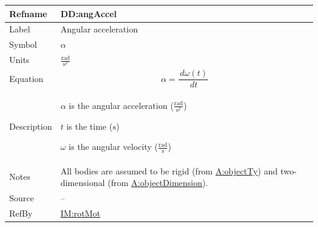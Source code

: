 \documentclass[12pt]{article}
\begin{document}
\vspace{\baselineskip}
\noindent
\begin{minipage}{\textwidth}
\begin{tabular}{>{\raggedright}p{}>{\raggedright\arraybackslash}p{}}
\toprule \textbf{Refname} & \textbf{DD:angAccel}
\label{DD:angAccel}
\\ \midrule
Label & Angular acceleration
        
\\ \midrule
Symbol & $α$
         
\\ \midrule
Units & $\frac{\text{rad}}{\text{s}^{2}}$
        
\\ \midrule
Equation & \begin{displaymath}
           α=\frac{\,dω\left(t\right)}{\,dt}
           \end{displaymath}
\\ \midrule
Description & \begin{symbDescription}
              \item{$α$ is the angular acceleration ($\frac{\text{rad}}{\text{s}^{2}}$)}
              \item{$t$ is the time (${\text{s}}$)}
              \item{$ω$ is the angular velocity ($\frac{\text{rad}}{\text{s}}$)}
              \end{symbDescription}
\\ \midrule
Notes & All bodies are assumed to be rigid (from \hyperref[assumpOT]{A:objectTy}) and two-dimensional (from \hyperref[assumpOD]{A:objectDimension}).
        
\\ \midrule
Source & --
         
\\ \midrule
RefBy & \hyperref[IM:rotMot]{IM:rotMot}
        
\\ \bottomrule
\end{tabular}
\end{minipage}
\end{document}
